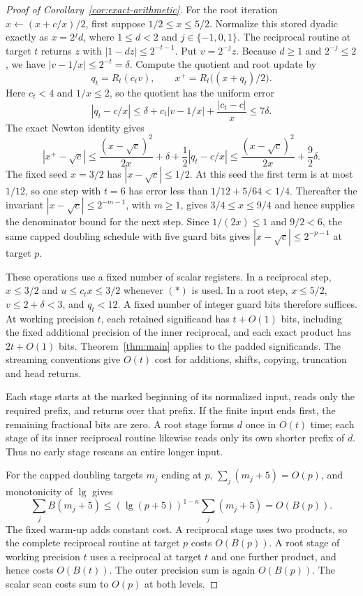 \begin{proof}[Proof of Corollary~\ref{cor:exact-arithmetic}]
For the root iteration $x\leftarrow(x+c/x)/2$, first suppose
$1/2\le x\le5/2$. Normalize this stored dyadic exactly as $x=2^j d$,
where $1\le d<2$ and $j\in\{-1,0,1\}$. The reciprocal routine at
target $t$ returns $z$ with $|1-dz|\le2^{-t-1}$. Put $v=2^{-j}z$.
Because $d\ge1$ and $2^{-j}\le2$, we have
$|v-1/x|\le2^{-t}=\delta$. Compute the quotient and root update by
\[
 q_t=R_t(c_t v),\qquad x^+=R_t\bigl((x+q_t)/2\bigr).
\]
Here $c_t<4$ and $1/x\le2$, so the quotient has the uniform error
\[
 |q_t-c/x|
 \le\delta+c_t|v-1/x|+\frac{|c_t-c|}{x}
 \le7\delta.
\]
The exact Newton identity gives
\[
 |x^+-\sqrt c|
 \le\frac{(x-\sqrt c)^2}{2x}+\delta+\frac12|q_t-c/x|
 \le\frac{(x-\sqrt c)^2}{2x}+\frac92\delta.
\]
The fixed seed $x=3/2$ has $|x-\sqrt c|\le1/2$. At this seed the
first term is at most $1/12$, so one step with $t=6$ has error less
than $1/12+5/64<1/4$. Thereafter the invariant
$|x-\sqrt c|\le2^{-m-1}$, with $m\ge1$, gives
$3/4\le x\le9/4$ and hence supplies the denominator bound for the
next step. Since $1/(2x)\le1$ and $9/2<6$, the same capped doubling
schedule with five guard bits gives $|x-\sqrt c|\le2^{-p-1}$ at
target $p$.

These operations use a fixed number of scalar registers. In a reciprocal
step, $x\le3/2$ and $u\le c_t x\le3/2$ whenever $(*)$ is used. In a
root step, $x\le5/2$, $v\le2+\delta<3$, and $q_t<12$. A fixed number
of integer guard bits therefore suffices. At working precision $t$,
each retained significand has $t+O(1)$ bits, including the fixed
additional precision of the inner reciprocal, and each exact product
has $2t+O(1)$ bits. Theorem~\ref{thm:main} applies to the padded
significands. The streaming conventions give $O(t)$ cost for additions,
shifts, copying, truncation and head returns.

Each stage starts at the marked beginning of its normalized input, reads
only the required prefix, and returns over that prefix. If the finite
input ends first, the remaining fractional bits are zero. A root stage
forms $d$ once in $O(t)$ time; each stage of its inner reciprocal routine
likewise reads only its own shorter prefix of $d$. Thus no early stage
rescans an entire longer input.

For the capped doubling targets $m_j$ ending at $p$,
$\sum_j(m_j+5)=O(p)$, and monotonicity of $\lg$ gives
\[
 \sum_j B(m_j+5)
 \le(\lg(p+5))^{1-\kappa}\sum_j(m_j+5)
 =O(B(p)).
\]
The fixed warm-up adds constant cost. A reciprocal stage uses two
products, so the complete reciprocal routine at target $p$ costs
$O(B(p))$. A root stage of working precision $t$ uses a reciprocal
at target $t$ and one further product, and hence costs $O(B(t))$.
The outer precision sum is again $O(B(p))$. The scalar scan costs
sum to $O(p)$ at both levels.


\end{proof}
